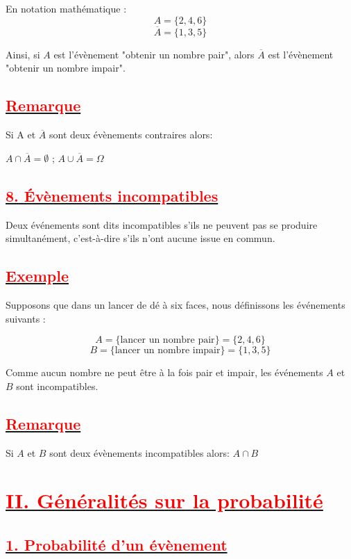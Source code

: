 \documentclass[12pt]{article}
\begin{document}
En notation mathématique :
\[ A = \{2, 4, 6\} \]
\[ \overline{A} = \{1, 3, 5\} \]

Ainsi, si $A$ est l'évènement "obtenir un nombre pair", alors $\overline{A}$ est l'évènement "obtenir un nombre impair".

\subsection*{\underline{\textbf{\textcolor{red}{Remarque}}}}
Si A et $\overline{A}$ sont deux évènements contraires alors:

$A\cap\overline{A}=\emptyset$ ; $A\cup\overline{A}=\Omega$

\subsection*{\underline{\textbf{\textcolor{red}{8. Évènements incompatibles}}}}

Deux événements sont dits incompatibles s'ils ne peuvent pas se produire simultanément, c'est-à-dire s'ils n'ont aucune issue en commun.

\subsection*{\underline{\textbf{\textcolor{red}{Exemple}}}}

Supposons que dans un lancer de dé à six faces, nous définissons les événements suivants :

\[ A = \{\text{lancer un nombre pair}\} = \{2, 4, 6\} \]
\[ B = \{\text{lancer un nombre impair}\} = \{1, 3, 5\} \]

Comme aucun nombre ne peut être à la fois pair et impair, les événements \(A\) et \(B\) sont incompatibles.

\subsection*{\underline{\textbf{\textcolor{red}{Remarque}}}}

Si $A$ et $B$ sont deux évènements incompatibles alors: $A\cap B$ 

\section*{\underline{\textbf{\textcolor{red}{II. Généralités sur la probabilité}}}}

\subsection*{\underline{\textbf{\textcolor{red}{1. Probabilité d'un évènement}}}}
\end{document}
